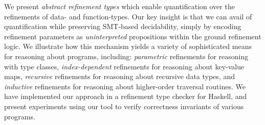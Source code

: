 We present \emph{abstract refinement types} which enable 
quantification over the refinements of data- and 
function-types. Our key insight is that we 
can avail of quantification while preserving SMT-based 
decidability, simply by encoding refinement parameters
as \emph{uninterpreted} propositions within the ground 
refinement logic.
%
We illustrate how this mechanism yields a variety 
of sophisticated means for reasoning about programs, including:
\emph{parametric} refinements for reasoning with 
type classes,
\emph{index-dependent} refinements for reasoning about 
key-value maps,
\emph{recursive} refinements for reasoning about 
recursive data types, and
\emph{inductive} refinements for reasoning about 
higher-order traversal routines.
%
We have implemented our approach in a refinement
type checker for Haskell, and present experiments using our tool
to verify correctness invariants of various programs.
